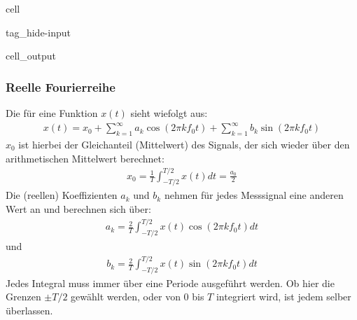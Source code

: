 \documentclass[letterpaper,10pt,english]{jupyterBook}
\begin{document}
\begin{sphinxuseclass}{cell}
\begin{sphinxuseclass}{tag_hide-input}\begin{sphinxVerbatimOutput}

\begin{sphinxuseclass}{cell_output}
\noindent{}

\end{sphinxuseclass}\end{sphinxVerbatimOutput}

\end{sphinxuseclass}
\end{sphinxuseclass}

\subsubsection{Reelle Fourierreihe}
\label{\detokenize{content/3_FourierAnalyse:reelle-fourierreihe}}
\sphinxAtStartPar
Die  für eine Funktion \(x(t)\) sieht wiefolgt aus:
\begin{equation*}
\begin{split}x(t) = x_0 + \sum_{k=1}^{\infty} a_k \cos(2\pi k f_0 t) + \sum_{k=1}^{\infty} b_k \sin(2\pi k f_0 t)\end{split}
\end{equation*}
\sphinxAtStartPar
\(x_0\) ist hierbei der Gleichanteil (Mittelwert) des Signals, der sich wieder über den arithmetischen Mittelwert berechnet:
\begin{equation*}
\begin{split}x_0 = \frac{1}{T} \int_{-T/2}^{T/2} x(t) dt = \frac{a_0}{2}\end{split}
\end{equation*}
\sphinxAtStartPar
Die (reellen) Koeffizienten \(a_k\) und \(b_k\) nehmen für jedes Messsignal eine anderen Wert an und berechnen sich über:
\begin{equation*}
\begin{split}a_k = \frac{2}{T}  \int_{-T/2}^{T/2} x(t) \cos(2\pi k f_0 t) dt \end{split}
\end{equation*}
\sphinxAtStartPar
und
\begin{equation*}
\begin{split}b_k = \frac{2}{T}  \int_{-T/2}^{T/2} x(t) \sin(2\pi k f_0 t) dt\end{split}
\end{equation*}
\sphinxAtStartPar
Jedes Integral muss immer über eine Periode ausgeführt werden. Ob hier die Grenzen \(\pm T/2\) gewählt werden, oder von \(0\) bis \(T\) integriert wird, ist jedem selber überlassen.
\end{document}
